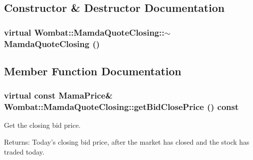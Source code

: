 \subsection{Constructor \& Destructor Documentation}
\hypertarget{classWombat_1_1MamdaQuoteClosing_9f5ff866d3758fe3abd59f561348964c}{
\subsubsection[$\sim$MamdaQuoteClosing]{\setlength{\rightskip}{0pt plus 5cm}virtual Wombat::Mamda\-Quote\-Closing::$\sim$Mamda\-Quote\-Closing ()}}
\label{classWombat_1_1MamdaQuoteClosing_9f5ff866d3758fe3abd59f561348964c}




\subsection{Member Function Documentation}
\hypertarget{classWombat_1_1MamdaQuoteClosing_49a102e8abafb806713366521b9adeea}{
\subsubsection[getBidClosePrice]{\setlength{\rightskip}{0pt plus 5cm}virtual const Mama\-Price\& Wombat::Mamda\-Quote\-Closing::get\-Bid\-Close\-Price () const}}
\label{classWombat_1_1MamdaQuoteClosing_49a102e8abafb806713366521b9adeea}


Get the closing bid price. 

\begin{Desc}
\item[Returns:]Today's closing bid price, after the market has closed and the stock has traded today. \end{Desc}


